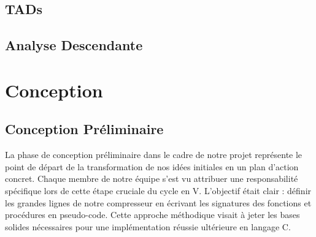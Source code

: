 \documentclass[12pt]{article}
\begin{document}
    \subsection{TADs}
    
    
    
    
    
    

    \subsection{Analyse Descendante}

    

    \newpage


    \section{Conception}

    \subsection{Conception Préliminaire}
    La phase de conception préliminaire dans le cadre de notre projet représente le point de départ de la transformation de nos idées initiales en un plan d'action concret. Chaque membre de notre équipe s'est vu attribuer une responsabilité spécifique lors de cette étape cruciale du cycle en V. L'objectif était clair : définir les grandes lignes de notre compresseur en écrivant les signatures des fonctions et procédures en pseudo-code. Cette approche méthodique visait à jeter les bases solides nécessaires pour une implémentation réussie ultérieure en langage C.\newline
    
    
    
    
    
    
    
    
\end{document}
